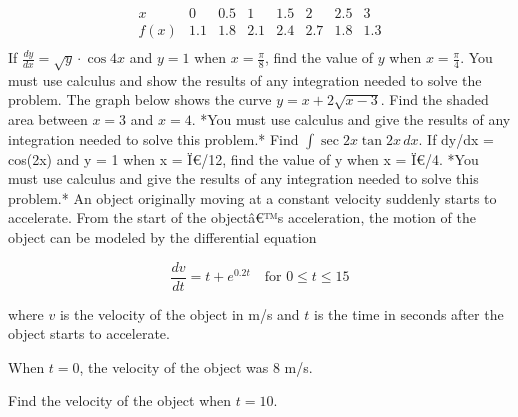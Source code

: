 \documentclass[12pt,addpoints]{exam}
\begin{document}
\begin{questions}
\[
\begin{array}{c|ccccccc}
x & 0 & 0.5 & 1 & 1.5 & 2 & 2.5 & 3 \\
\hline
f(x) & 1.1 & 1.8 & 2.1 & 2.4 & 2.7 & 1.8 & 1.3 \\
\end{array}
\]
\fillwithlines{3cm}
\question[5] If \( \frac{dy}{dx} = \sqrt{y} \cdot \cos 4x \) and \( y = 1 \) when \( x = \frac{\pi}{8} \), find the value of \( y \) when \( x = \frac{\pi}{4} \). You must use calculus and show the results of any integration needed to solve the problem.
\fillwithlines{3cm}
\question[5] The graph below shows the curve \( y = x + 2\sqrt{x - 3} \). Find the shaded area between \( x = 3 \) and \( x = 4 \). *You must use calculus and give the results of any integration needed to solve this problem.*
\fillwithlines{3cm}
\question[5] Find \(\int \sec 2x \tan 2x \, dx\).
\fillwithlines{3cm}
\question[5] If dy/dx = cos(2x) and y = 1 when x = Ï€/12, find the value of y when x = Ï€/4. *You must use calculus and give the results of any integration needed to solve this problem.*
\fillwithlines{3cm}
\question[5] An object originally moving at a constant velocity suddenly starts to accelerate. From the start of the objectâ€™s acceleration, the motion of the object can be modeled by the differential equation

\[ \frac{dv}{dt} = t + e^{0.2t} \quad \text{for } 0 \leq t \leq 15 \]

where \( v \) is the velocity of the object in m/s and \( t \) is the time in seconds after the object starts to accelerate.

When \( t = 0 \), the velocity of the object was 8 m/s.

Find the velocity of the object when \( t = 10 \).


\end{questions}
\end{document}
